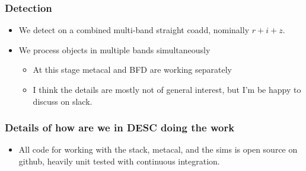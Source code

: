 \documentclass{beamer}
\begin{document}
\frame
{

    \frametitle{Detection}


    \begin{itemize}

        \item We detect on a combined multi-band straight coadd, nominally
            $r+i+z$.

        \item We process objects in multiple bands simultaneously 
            \begin{itemize}
                \item At this stage metacal and BFD are working separately
                \item I think the details are mostly not of general interest, but
                    I'm be happy to discuss on slack.
            \end{itemize}

    \end{itemize}

}

\frame
{

    \frametitle{Details of how are we in DESC doing the work}

    \begin{itemize}

        \item All code for working with the stack, metacal, and the sims is
            open source on github, heavily unit tested with continuous
            integration.

    \end{itemize}

}
\end{document}
